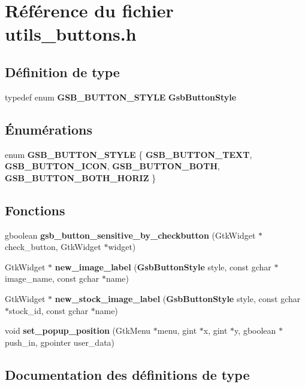 \section{Référence du fichier utils\_\-buttons.h}
\label{utils__buttons_8h}
\subsection*{Définition de type}
\begin{DoxyCompactItemize}
\item 
typedef enum {\bf GSB\_\-BUTTON\_\-STYLE} {\bf GsbButtonStyle}
\end{DoxyCompactItemize}
\subsection*{Énumérations}
\begin{DoxyCompactItemize}
\item 
enum {\bf GSB\_\-BUTTON\_\-STYLE} \{ {\bf GSB\_\-BUTTON\_\-TEXT}, 
{\bf GSB\_\-BUTTON\_\-ICON}, 
{\bf GSB\_\-BUTTON\_\-BOTH}, 
{\bf GSB\_\-BUTTON\_\-BOTH\_\-HORIZ}
 \}
\end{DoxyCompactItemize}
\subsection*{Fonctions}
\begin{DoxyCompactItemize}
\item 
gboolean {\bf gsb\_\-button\_\-sensitive\_\-by\_\-checkbutton} (GtkWidget $\ast$check\_\-button, GtkWidget $\ast$widget)
\item 
GtkWidget $\ast$ {\bf new\_\-image\_\-label} ({\bf GsbButtonStyle} style, const gchar $\ast$image\_\-name, const gchar $\ast$name)
\item 
GtkWidget $\ast$ {\bf new\_\-stock\_\-image\_\-label} ({\bf GsbButtonStyle} style, const gchar $\ast$stock\_\-id, const gchar $\ast$name)
\item 
void {\bf set\_\-popup\_\-position} (GtkMenu $\ast$menu, gint $\ast$x, gint $\ast$y, gboolean $\ast$push\_\-in, gpointer user\_\-data)
\end{DoxyCompactItemize}


\subsection{Documentation des définitions de type}
